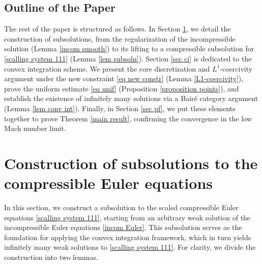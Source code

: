 \documentclass[12pt,reqno]{amsart}
\theoremstyle{definition}
\theoremstyle{remark}
\numberwithin{equation}{section}
\begin{document}
\subsection*{Outline of the Paper}
The rest of the paper is structured as follows. In Section \ref{sec sub}, we detail the construction of subsolutions, from the regularization of the incompressible solution (Lemma \ref{incom smooth}) to its lifting to a compressible subsolution for \eqref{scalling system 111} (Lemma \ref{lem subsoln}). Section \ref{sec ci} is dedicated to the convex integration scheme. We present the core discretization and $L^1$-coercivity argument under the new constraint \eqref{eq new constr} (Lemma \ref{L1-coercivity}), prove the uniform estimate \eqref{eq unif} (Proposition \ref{proposition points}), and establish the existence of infinitely many solutions via a Bair\'e category argument (Lemma \ref{lem conv int}). Finally, in Section \ref{sec pf}, we put these elements together to prove Theorem \ref{main result}, confirming the convergence in the low Mach number limit.

\bigskip

\section{Construction of subsolutions to the compressible Euler equations}\label{sec sub}
In this section, we construct a subsolution to the scaled compressible Euler equations \eqref{scalling system 111}, starting from an arbitrary weak solution of the incompressible Euler equations \eqref{incom Euler}.
This subsolution serves as the foundation for applying the convex integration framework, which in turn yields infinitely many weak solutions to \eqref{scalling system 111}. For clarity, we divide the construction into two lemmas.
\smallskip
\end{document}
